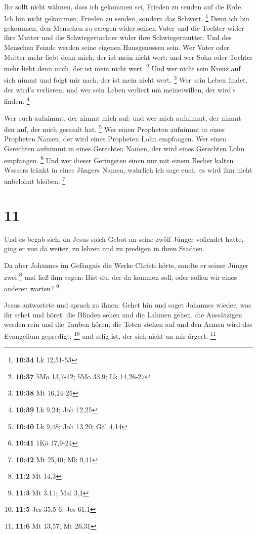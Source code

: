  Ihr sollt nicht wähnen, dass ich gekommen sei, Frieden zu
senden auf die Erde. Ich bin nicht gekommen, Frieden zu senden, sondern
das Schwert. \footnote{\textbf{10:34} Lk 12,51-53}  Denn
ich bin gekommen, den Menschen zu erregen wider seinen Vater und die
Tochter wider ihre Mutter und die Schwiegertochter wider ihre
Schwiegermutter.  Und des Menschen Feinde werden seine
eigenen Hausgenossen sein.  Wer Vater oder Mutter mehr
liebt denn mich, der ist mein nicht wert; und wer Sohn oder Tochter mehr
liebt denn mich, der ist mein nicht wert. \footnote{\textbf{10:37} 5Mo
  13,7-12; 5Mo 33,9; Lk 14,26-27}  Und wer nicht sein Kreuz
auf sich nimmt und folgt mir nach, der ist mein nicht wert. \footnote{\textbf{10:38}
  Mt 16,24-25}  Wer sein Leben findet, der wird's
verlieren; und wer sein Leben verliert um meinetwillen, der wird's
finden. \footnote{\textbf{10:39} Lk 9,24; Joh 12,25}

 Wer euch aufnimmt, der nimmt mich auf; und wer mich
aufnimmt, der nimmt den auf, der mich gesandt hat. \footnote{\textbf{10:40}
  Lk 9,48; Joh 13,20; Gal 4,14}  Wer einen Propheten
aufnimmt in eines Propheten Namen, der wird eines Propheten Lohn
empfangen. Wer einen Gerechten aufnimmt in eines Gerechten Namen, der
wird eines Gerechten Lohn empfangen. \footnote{\textbf{10:41} 1Kö
  17,9-24}  Und wer dieser Geringsten einen nur mit einem
Becher kalten Wassers tränkt in eines Jüngers Namen, wahrlich ich sage
euch: es wird ihm nicht unbelohnt bleiben. \footnote{\textbf{10:42} Mt
  25,40; Mk 9,41}

\hypertarget{section-7}{%
\section{11}\label{section-7}}

 Und es begab sich, da Jesus solch Gebot an seine zwölf
Jünger vollendet hatte, ging er von da weiter, zu lehren und zu predigen
in ihren Städten.

 Da aber Johannes im Gefängnis die Werke Christi hörte,
sandte er seiner Jünger zwei \footnote{\textbf{11:2} Mt 14,3}
 und ließ ihm sagen: Bist du, der da kommen soll, oder
sollen wir eines anderen warten? \footnote{\textbf{11:3} Mt 3,11; Mal
  3,1}

 Jesus antwortete und sprach zu ihnen: Gehet hin und saget
Johannes wieder, was ihr sehet und höret:  die Blinden sehen
und die Lahmen gehen, die Aussätzigen werden rein und die Tauben hören,
die Toten stehen auf und den Armen wird das Evangelium gepredigt;
\footnote{\textbf{11:5} Jes 35,5-6; Jes 61,1}  und selig
ist, der sich nicht an mir ärgert. \footnote{\textbf{11:6} Mt 13,57; Mt
  26,31}

